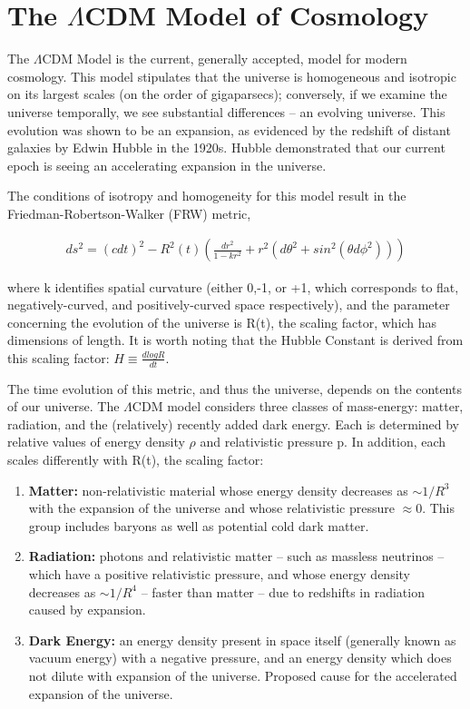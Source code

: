 \documentclass{report}
\begin{document}
\section{The $\Lambda$CDM Model of Cosmology}

The $\Lambda$CDM Model is the current, generally accepted, model for modern cosmology. This model stipulates that the universe is homogeneous and isotropic on its largest scales (on the order of gigaparsecs); conversely, if we examine the universe temporally, we see substantial differences -- an evolving universe. This evolution was shown to be an expansion, as evidenced by the redshift of distant galaxies by Edwin Hubble in the 1920s. Hubble demonstrated that our current epoch is seeing an accelerating expansion in the universe.

The conditions of isotropy and homogeneity for this model result in the Friedman-Robertson-Walker (FRW) metric,

\begin{eqnarray}
ds^2 = (cdt)^2 - R^2(t)\left(\frac{dr^2}{1-kr^2} + r^2(d\theta^2 + sin^2(\theta d \phi^2))\right)
\end{eqnarray}

where k identifies spatial curvature (either 0,-1, or +1, which corresponds to flat, negatively-curved, and positively-curved space respectively), and the parameter concerning the evolution of the universe is R(t), the scaling factor, which has dimensions of length. It is worth noting that the Hubble Constant is derived from this scaling factor: $H \equiv \frac{d log R}{dt}$.

The time evolution of this metric, and thus the universe, depends on the contents of our universe. The $\Lambda$CDM model considers three classes of mass-energy: matter, radiation, and the (relatively) recently added dark energy. Each is determined by relative values of energy density $\rho$ and relativistic pressure p. In addition, each scales differently with R(t), the scaling factor:

\begin{enumerate}
\item \textbf{Matter:} non-relativistic material whose energy density decreases as $\sim 1/R^3$ with the expansion of the universe and whose relativistic pressure $\approx 0$. This group includes baryons as well as potential cold dark matter.
\item \textbf{Radiation:} photons and relativistic matter -- such as massless neutrinos -- which have a positive relativistic pressure, and whose energy density decreases as $\sim 1/R^4$ -- faster than matter -- due to redshifts in radiation caused by expansion.
\item \textbf{Dark Energy:} an energy density present in space itself (generally known as vacuum energy) with a negative pressure, and an energy density which does not dilute with expansion of the universe. Proposed cause for the accelerated expansion of the universe.
\end{enumerate}
\end{document}
